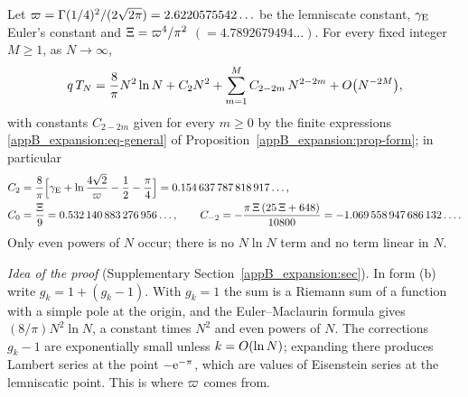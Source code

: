 \begin{theorem}[Large-$N$ expansion, $\dd=2$]\label{s4_mfpt:thm-expansion}
Let $\varpi=\Gamma(1/4)^{2}/(2\sqrt{2\pi})=2.6220575542\ldots$ be the lemniscate constant, $\gamma_{\mathrm{E}}$ Euler's constant and
$\Xi=\varpi^{4}/\pi^{2}$ $(=4.7892679494\ldots)$. For every fixed integer $M\ge1$, as $N\to\infty$,
\begin{equation}\label{s4_mfpt:eq-expansion}
  q\,T_{N}=\frac8\pi N^{2}\ln N+C_{2}N^{2}+\sum_{m=1}^{M}C_{2-2m}\,N^{2-2m}+O\bigl(N^{-2M}\bigr),
\end{equation}
with constants $C_{2-2m}$ given for every $m\ge0$ by the finite expressions \eqref{appB_expansion:eq-general} of
Proposition~\ref{appB_expansion:prop-form}; in particular
\begin{equation}\label{s4_mfpt:eq-coeffs}
\begin{aligned}
C_{2}&=\frac8\pi\Bigl[\gamma_{\mathrm{E}}+\ln\frac{4\sqrt2}{\varpi}-\frac12-\frac\pi4\Bigr]=0.154\,637\,787\,818\,917\ldots,\\
C_{0}&=\frac{\Xi}{9}=0.532\,140\,883\,276\,956\ldots,\qquad
C_{-2}=-\frac{\pi\,\Xi\,(25\,\Xi+648)}{10800}=-1.069\,558\,947\,686\,132\ldots .
\end{aligned}
\end{equation}
Only even powers of $N$ occur; there is no $N\ln N$ term and no term linear in $N$.
\end{theorem}

\emph{Idea of the proof} (Supplementary Section~\ref{appB_expansion:sec}). In form (b) write $g_k=1+(g_k-1)$. With
$g_k=1$ the sum is a Riemann sum of a function with a simple pole at the origin, and the Euler--Maclaurin formula
gives $(8/\pi)N^{2}\ln N$, a constant times $N^{2}$ and even powers of $N$. The corrections $g_k-1$ are exponentially
small unless $k=O(\ln N)$; expanding there produces Lambert series at the point $-\mathrm{e}^{-\pi}$, which are values
of Eisenstein series at the lemniscatic point. This is where $\varpi$ comes from.

